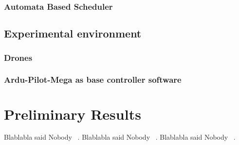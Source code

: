\documentclass[11pt]{article}
\begin{document}
\subsubsection{Automata Based Scheduler}

\subsection{Experimental environment}
\subsubsection{Drones}
\subsubsection{Ardu-Pilot-Mega as base controller software}

\section{Preliminary Results}
Blablabla said Nobody ~\cite{Merav}.
Blablabla said Nobody ~\cite{APM}.
Blablabla said Nobody ~\cite{RTComposer}.



    
    {}
\end{document}
